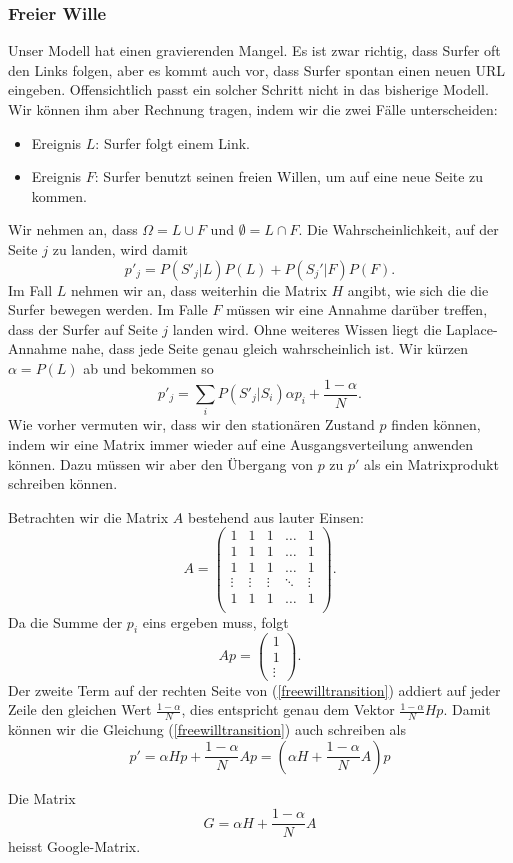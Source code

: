 \subsubsection{Freier Wille}
Unser Modell hat einen gravierenden Mangel.
Es ist zwar richtig, dass Surfer oft den
Links folgen, aber es kommt auch vor, dass
Surfer spontan einen neuen URL eingeben.
Offensichtlich passt ein solcher Schritt nicht in das bisherige Modell.
Wir können
ihm aber Rechnung tragen, indem wir die zwei Fälle unterscheiden:
\begin{itemize}
\item Ereignis $L$: Surfer folgt einem Link.
\item Ereignis $F$: Surfer benutzt seinen freien Willen,
um auf eine neue Seite zu kommen.
\end{itemize}
Wir nehmen an, dass $\Omega=L\cup F$ und $\emptyset=L\cap F$.
Die Wahrscheinlichkeit,
auf der Seite $j$ zu landen, wird damit
\[
p'_j=P(S'_j|L)P(L)+P(S_j'|F)P(F).
\]
Im Fall $L$ nehmen wir an, dass weiterhin die Matrix $H$ angibt, wie sich die
die Surfer bewegen werden.
Im Falle $F$ müssen wir eine Annahme darüber treffen,
dass der Surfer auf Seite $j$ landen wird.
Ohne weiteres Wissen liegt die Laplace-Annahme
nahe, dass jede Seite genau gleich wahrscheinlich ist.
Wir kürzen $\alpha=P(L)$ ab und bekommen so
\begin{equation}
p'_j=\sum_{i}P(S'_j|S_i)\alpha p_i+\frac{1-\alpha}N.
\label{freewilltransition}
\end{equation}
Wie vorher vermuten wir, dass wir den stationären Zustand $p$ finden können,
indem wir eine Matrix immer wieder auf eine Ausgangsverteilung anwenden können.
Dazu müssen wir aber den Übergang von $p$ zu $p'$ als ein Matrixprodukt
schreiben können.

Betrachten wir die Matrix $A$ bestehend aus lauter Einsen:
\[
A=
\begin{pmatrix}
1&1&1&\dots&1\\
1&1&1&\dots&1\\
1&1&1&\dots&1\\
\vdots&\vdots&\vdots&\ddots&\vdots\\
1&1&1&\dots&1\\
\end{pmatrix}.
\]
Da die Summe der $p_i$ eins ergeben muss, folgt
\[
Ap=\left(\begin{matrix}1\\1\\\vdots\end{matrix}\right).
\]
Der zweite Term auf der rechten Seite von (\ref{freewilltransition})
addiert auf jeder
Zeile den gleichen Wert $\frac{1-\alpha}{N}$, dies entspricht genau dem Vektor
$\frac{1-\alpha}{N}Hp$.
Damit können wir die Gleichung (\ref{freewilltransition}) auch schreiben als
\begin{equation}
p'=\alpha Hp + \frac{1-\alpha}{N}Ap = \left(\alpha H+\frac{1-\alpha}{N}A\right)p
\end{equation}
\begin{definition} Die Matrix
\[
G=
\alpha H+\frac{1-\alpha}{N}A
\]
heisst Google-Matrix.
\end{definition}

